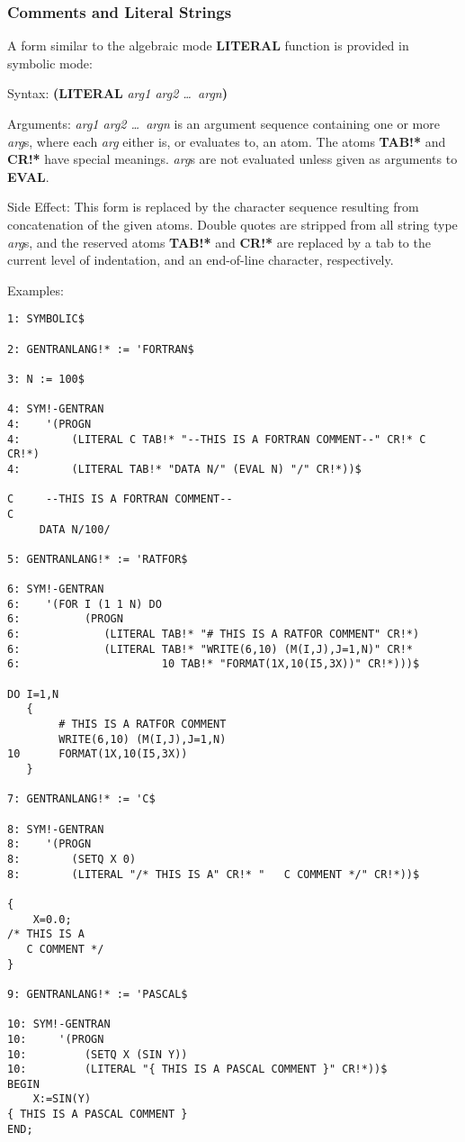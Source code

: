 \subsubsection{Comments and Literal Strings}
A form similar to the algebraic mode {\bf LITERAL} function is provided in
symbolic mode:
\begin{describe}{Syntax:}
{\bf (LITERAL} {\it arg1 arg2 \dots\  argn\/}{\bf )}
\end{describe} 
\begin{describe}{Arguments:}
{\it arg1 arg2 \dots\  argn\/} is an argument sequence containing one or more
{\it arg\/}s, where each {\it arg\/} either is, or evaluates to, an atom.  The
atoms {\bf TAB!*} and {\bf CR!*} have special meanings.  {\it arg\/}s are
not evaluated unless given as arguments to {\bf EVAL}.
\end{describe} 
\begin{describe}{Side Effect:}
This form is replaced by the character sequence resulting from
concatenation of the given atoms.  Double quotes are stripped from
all string type {\it arg\/}s, and the reserved atoms {\bf TAB!*}
and {\bf CR!*} are replaced by a tab to the current level of indentation,
and an end-of-line character, respectively.
\end{describe} 
\begin{describe}{Examples:}
\begin{verbatim}
1: SYMBOLIC$ 

2: GENTRANLANG!* := 'FORTRAN$

3: N := 100$

4: SYM!-GENTRAN 
4:    '(PROGN 
4:        (LITERAL C TAB!* "--THIS IS A FORTRAN COMMENT--" CR!* C CR!*) 
4:        (LITERAL TAB!* "DATA N/" (EVAL N) "/" CR!*))$

C     --THIS IS A FORTRAN COMMENT--
C
     DATA N/100/

5: GENTRANLANG!* := 'RATFOR$

6: SYM!-GENTRAN 
6:    '(FOR I (1 1 N) DO 
6:          (PROGN 
6:             (LITERAL TAB!* "# THIS IS A RATFOR COMMENT" CR!*) 
6:             (LITERAL TAB!* "WRITE(6,10) (M(I,J),J=1,N)" CR!* 
6:                      10 TAB!* "FORMAT(1X,10(I5,3X))" CR!*)))$

DO I=1,N
   {
        # THIS IS A RATFOR COMMENT
        WRITE(6,10) (M(I,J),J=1,N)
10      FORMAT(1X,10(I5,3X))
   }

7: GENTRANLANG!* := 'C$

8: SYM!-GENTRAN 
8:    '(PROGN 
8:        (SETQ X 0) 
8:        (LITERAL "/* THIS IS A" CR!* "   C COMMENT */" CR!*))$

{
    X=0.0;
/* THIS IS A
   C COMMENT */
}

9: GENTRANLANG!* := 'PASCAL$

10: SYM!-GENTRAN
10:     '(PROGN
10:         (SETQ X (SIN Y))
10:         (LITERAL "{ THIS IS A PASCAL COMMENT }" CR!*))$
BEGIN
    X:=SIN(Y)
{ THIS IS A PASCAL COMMENT }
END;

\end{verbatim}
\end{describe} 


